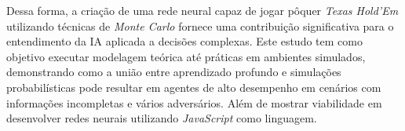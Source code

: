 Dessa forma, a criação de uma rede neural capaz de jogar pôquer \textit{Texas Hold’Em} utilizando técnicas de \textit{Monte Carlo} fornece uma contribuição significativa para o entendimento da IA aplicada a decisões complexas. Este estudo tem como objetivo executar modelagem teórica até práticas em ambientes simulados, demonstrando como a união entre aprendizado profundo e simulações probabilísticas pode resultar em agentes de alto desempenho em cenários com informações incompletas e vários adversários. Além de mostrar viabilidade em desenvolver redes neurais utilizando \textit{JavaScript} como linguagem.
